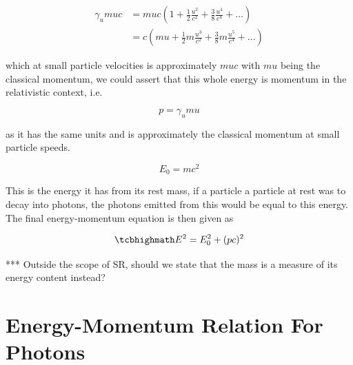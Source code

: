 \begin{equation}
	\begin{aligned}
		\gamma_{u} {m}{u}{c} & = {m}{u}{c} \left(1 + \frac{1}{2}\frac{u^2}{{c}^2} + \frac{3}{8}\frac{u^4}{c^4} + ...
		\right)                                                                                                       \\
		                     & ={c}\left( {m}{u} + \frac{1}{2}m \frac{u^3}{{c}^2} + \frac{3}{8}m\frac{u^5}{c^4} + ...
		\right)
	\end{aligned}
\end{equation}

which at small particle velocities is approximately ${m}{u}{c}$ with ${m}{u}$ being the classical momentum, we could assert that this whole energy is momentum in the relativistic context, i.e.

\begin{equation}
	p = \gamma_{u} {m}{u}
\end{equation}

as it has the same units and is approximately the classical momentum at small particle speeds.

\begin{equation}
	E_0 = {m}{c}^2
\end{equation}

This is the energy it has from its rest mass, if a particle a particle at rest was to decay into photons, the photons emitted from this would be equal to this energy.
The final energy-momentum equation is then given as

\begin{equation}
	\mhl{
		E^2 = E_0^2 + (pc)^2
	}
\end{equation}

*** Outside the scope of SR, should we state that the mass is a measure of its energy content instead?



\section{Energy-Momentum Relation For Photons} \label{sect: Energy-Momentum Relation For Photons}


